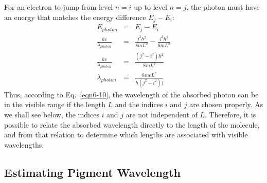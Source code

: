 For an electron to jump from level $n=i$ up to level $n=j$, the photon must have an energy that matches the energy difference $E_j-E_i$:
\begin{eqnarray}\label{eqn6-10}
E_{photon} &=& E_j - E_i\nonumber\\
\frac{hc}{\lambda_{photon}}&=& \frac{j^2h^2}{8mL^2}-\frac{i^2h^2}{8mL^2}\nonumber\\
\frac{hc}{\lambda_{photon}}&=& \frac{\left(j^2-i^2\right)h^2}{8mL^2}\nonumber\\
\lambda_{photon} &=& \frac{8mcL^2}{h\left(j^2-i^2\right))}
\end{eqnarray}
Thus, according to Eq.~\ref{eqn6-10}, the wavelength of the absorbed photon can be in the visible range if the length $L$ and the indices $i$ and $j$ are chosen properly. As we shall see below, the indices $i$ and $j$ are not independent of $L$. Therefore, it is possible to relate the absorbed wavelength directly to the length of the molecule, and from that relation to determine which lengths are associated with visible wavelengths.

\subsection{Estimating Pigment Wavelength}

